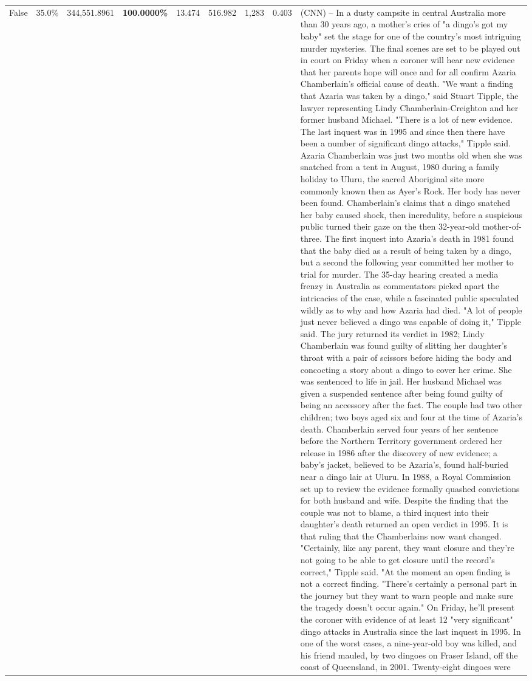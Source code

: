 \begin{table}[H]
\begin{tabular}{lllrlllll}
False & 35.0\% & 344,551.8961 & \bfseries \color{red} 100.0000\% & 13.474 & 516.982 & 1,283 & 0.403 & (CNN) -- In a dusty campsite in central Australia more than 30 years ago, a mother's cries of "a dingo's got my baby" set the stage for one of the country's most intriguing murder mysteries. The final scenes are set to be played out in court on Friday when a coroner will hear new evidence that her parents hope will once and for all confirm Azaria Chamberlain's official cause of death. "We want a finding that Azaria was taken by a dingo," said Stuart Tipple, the lawyer representing Lindy Chamberlain-Creighton and her former husband Michael. "There is a lot of new evidence. The last inquest was in 1995 and since then there have been a number of significant dingo attacks," Tipple said. Azaria Chamberlain was just two months old when she was snatched from a tent in August, 1980 during a family holiday to Uluru, the sacred Aboriginal site more commonly known then as Ayer's Rock. Her body has never been found. Chamberlain's claims that a dingo snatched her baby caused shock, then incredulity, before a suspicious public turned their gaze on the then 32-year-old mother-of-three. The first inquest into Azaria's death in 1981 found that the baby died as a result of being taken by a dingo, but a second the following year committed her mother to trial for murder. The 35-day hearing created a media frenzy in Australia as commentators picked apart the intricacies of the case, while a fascinated public speculated wildly as to why and how Azaria had died. "A lot of people just never believed a dingo was capable of doing it," Tipple said. The jury returned its verdict in 1982; Lindy Chamberlain was found guilty of slitting her daughter's throat with a pair of scissors before hiding the body and concocting a story about a dingo to cover her crime. She was sentenced to life in jail. Her husband Michael was given a suspended sentence after being found guilty of being an accessory after the fact. The couple had two other children; two boys aged six and four at the time of Azaria's death. Chamberlain served four years of her sentence before the Northern Territory government ordered her release in 1986 after the discovery of new evidence; a baby's jacket, believed to be Azaria's, found half-buried near a dingo lair at Uluru. In 1988, a Royal Commission set up to review the evidence formally quashed convictions for both husband and wife. Despite the finding that the couple was not to blame, a third inquest into their daughter's death returned an open verdict in 1995. It is that ruling that the Chamberlains now want changed. "Certainly, like any parent, they want closure and they're not going to be able to get closure until the record's correct," Tipple said. "At the moment an open finding is not a correct finding. "There's certainly a personal part in the journey but they want to warn people and make sure the tragedy doesn't occur again." On Friday, he'll present the coroner with evidence of at least 12 "very significant" dingo attacks in Australia since the last inquest in 1995. In one of the worst cases, a nine-year-old boy was killed, and his friend mauled, by two dingoes on Fraser Island, off the coast of Queensland, in 2001. Twenty-eight dingoes were 
\end{tabular}
\end{table}

